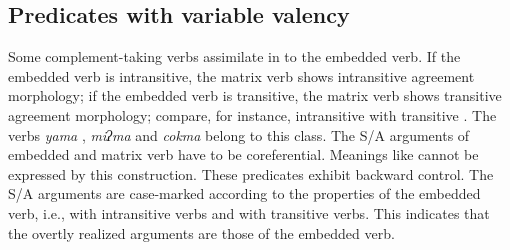  \begin{table}
\caption{Argument realization in infinitival complement constructions}\label{overview-infinitival4}
\end{table}


 

\subsection{Predicates with variable valency}

Some complement-taking verbs assimilate in  to the embedded verb. If the embedded verb is intransitive, the matrix verb shows intransitive agreement morphology; if the embedded verb is transitive, the matrix verb shows transitive agreement morphology; compare, for instance, intransitive \Next[a] with transitive \Next[b]. The verbs \emph{yama} , \emph{miʔma}  and \emph{cokma}  belong to this class. The S/A arguments of embedded and matrix verb have to be coreferential. Meanings like  cannot be expressed by this construction. These predicates exhibit backward control. The S/A arguments are case-marked according to the properties of the embedded verb, i.e.,  with intransitive verbs and  with transitive verbs. This indicates that the overtly realized arguments are those of the embedded verb.

